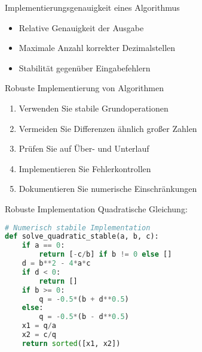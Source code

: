 \begin{definition}{Implementierungsgenauigkeit eines Algorithmus}
\begin{itemize}
    \item Relative Genauigkeit der Ausgabe
    \item Maximale Anzahl korrekter Dezimalstellen
    \item Stabilität gegenüber Eingabefehlern
\end{itemize}
\end{definition}

\begin{KR}{Robuste Implementierung von Algorithmen}
\begin{enumerate}
    \item Verwenden Sie stabile Grundoperationen
    \item Vermeiden Sie Differenzen ähnlich großer Zahlen
    \item Prüfen Sie auf Über- und Unterlauf
    \item Implementieren Sie Fehlerkontrollen
    \item Dokumentieren Sie numerische Einschränkungen
\end{enumerate}
\end{KR}

\begin{examplecode}{Robuste Implementation} Quadratische Gleichung:
\begin{lstlisting}[language=Python, style=basesmol]
# Numerisch stabile Implementation
def solve_quadratic_stable(a, b, c):
    if a == 0:
        return [-c/b] if b != 0 else []
    d = b**2 - 4*a*c
    if d < 0:
        return []
    if b >= 0:
        q = -0.5*(b + d**0.5)
    else:
        q = -0.5*(b - d**0.5)
    x1 = q/a
    x2 = c/q
    return sorted([x1, x2])
\end{lstlisting}
\end{examplecode}
